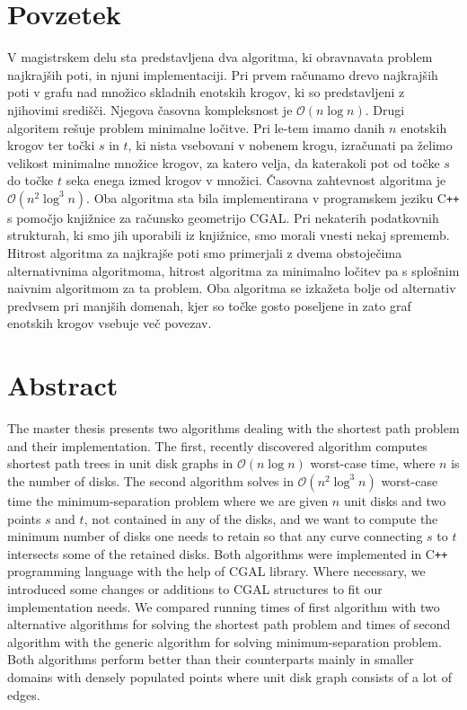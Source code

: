 \documentclass[a4paper, 12pt]{book}
\newcommand{\OO}{\ensuremath{\mathcal{O}}} %
\begin{document}
\chapter*{Povzetek}
V magistrskem delu sta predstavljena dva algoritma, ki obravnavata problem najkrajših poti, in njuni implementaciji. Pri prvem računamo drevo najkrajših poti v grafu nad množico skladnih enotskih krogov, ki so predstavljeni z njihovimi središči. Njegova časovna kompleksnost je $\OO(n\log n)$. Drugi algoritem rešuje problem minimalne ločitve. Pri le-tem imamo danih $n$ enotskih krogov ter točki $s$ in $t$, ki nista vsebovani v nobenem krogu, izračunati pa želimo velikost minimalne množice krogov, za katero velja, da katerakoli pot od točke $s$ do točke $t$ seka enega izmed krogov v množici. Časovna zahtevnost algoritma je $\OO(n^2\log^3n)$. Oba algoritma sta bila implementirana v programskem jeziku C\texttt{+}\texttt{+} s pomočjo knjižnice za računsko geometrijo CGAL. Pri nekaterih podatkovnih strukturah, ki smo jih uporabili iz knjižnice, smo morali vnesti nekaj sprememb. Hitrost algoritma za najkrajše poti smo primerjali z dvema obstoječima alternativnima algoritmoma, hitrost algoritma za minimalno ločitev pa s splošnim naivnim algoritmom za ta problem. Oba algoritma se izkažeta bolje od alternativ predvsem pri manjših domenah, kjer so točke gosto poseljene in zato graf enotskih krogov vsebuje več povezav. 

\chapter*{Abstract}
The master thesis presents two algorithms dealing with the shortest path problem and their implementation. The first, recently discovered algorithm computes shortest path trees in unit disk graphs in $\OO(n\log n)$ worst-case time, where $n$ is the number of disks. The second algorithm solves in $\OO(n^2\log^3n)$ worst-case time the minimum-separation problem where we are given $n$ unit disks and two points $s$ and $t$, not contained in any of the disks, and we want to compute the minimum number of disks one needs to retain so that any curve connecting $s$ to $t$ intersects some of the retained disks. Both algorithms were implemented in C\texttt{+}\texttt{+} programming language with the help of CGAL library. Where necessary, we introduced some changes or additions to CGAL structures to fit our implementation needs. We compared running times of first algorithm with two alternative algorithms for solving the shortest path problem and times of second algorithm with the generic algorithm for solving minimum-separation problem. Both algorithms perform better than their counterparts mainly in smaller domains with densely populated points where unit disk graph consists of a lot of edges.
\end{document}
